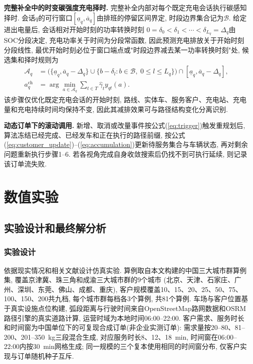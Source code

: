 \documentclass{setp-new}
\begin{document}
\textbf{完整补全中的时变碳强度充电择时.}
完整补全内部对每个既定充电会话执行碳感知择时.
会话$q$的可行窗口$[\underline a_q,\overline a_q]$由排班的停留区间界定,
时段边界集合记为$\mathcal B$.
给定进出电量后, 会话相对开始时刻的功率转换时刻
$0=\delta_0<\delta_1<\cdots<\delta_{L_q}=\Delta_q$由SOC分段决定,
充电功率关于时间为分段常函数,
因此预测充电排放关于开始时刻分段线性,
最优开始时刻必位于窗口端点或"时段边界减去某一功率转换时刻"处,
候选集和择时规则为
\begin{align}
\mathcal A_q&=\bigl(\{\underline a_q,\overline a_q-\Delta_q\}
\cup\{b-\delta_l:b\in\mathcal B,\;0\le l\le L_q\}\bigr)
\cap[\underline a_q,\overline a_q-\Delta_q], \label{eq:charging-candidates}\\
a_q^{\mathrm{ch}}&=\arg\min_{a\in\mathcal A_q}\sum_{t\in T}\widehat\gamma_t y_{qt}(a). \label{eq:charging-rule}
\end{align}
该步骤仅优化既定充电会话的开始时刻,
路线、实体车、服务客户、充电站、充电量和充电持续时间均保持不变,
因此其减排效果可与路径结构变化分离识别.

\textbf{动态订单下的滚动调用.}
新增、取消或改量事件按公式(\ref{eq:trigger})触发重规划后,
算法冻结已经完成、已经发车和正在执行的路径前缀,
按公式(\ref{eq:customer_update})--(\ref{eq:accumulation})更新待服务集合与车辆状态,
再对剩余问题重新执行步骤1--6.
若各视角完成自身收敛搜索后仍找不到可执行延续, 则记录该订单流失败.


\section{数值实验}

\subsection{实验设计和最终解分析}

\subsubsection{实验设计}

依据现实情况和相关文献设计仿真实验.
算例取自本文构建的中国三大城市群算例集,
覆盖京津冀、珠三角和成渝三大城市群的9个城市
(北京、天津、石家庄、广州、深圳、东莞、佛山、成都、重庆),
客户规模覆盖10、15、20、25、50、75、100、150、200共九档,
每个城市群每档各3个算例, 共81个算例.
车场与客户位置基于真实设施点位构建,
弧段距离与行驶时间来自OpenStreetMap路网数据\cite{ref:84}和OSRM路径引擎\cite{ref:85}的真实道路计算,
运营时域为本地时间06:00--22:00.
客户需求、服务时长和时间窗为中国单位下的可复现合成订单(非企业实测订单):
需求量按20--80、81--200、201--350~kg三段混合生成,
对应服务时长8、12、18~min, 时间窗在06:00--22:00内按30~min网格生成;
同一规模的三个复本使用相同的时间窗分布, 仅客户实现与订单随机种子互斥.
\end{document}
